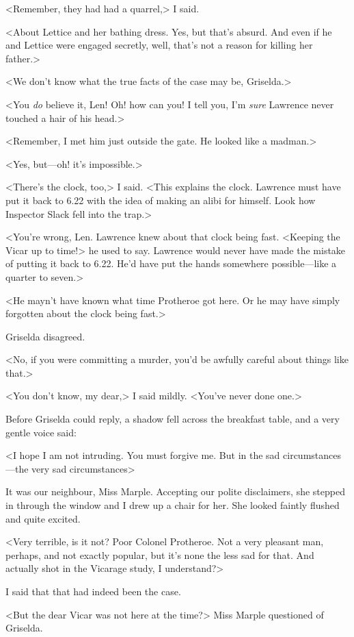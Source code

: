 <Remember, they had had a quarrel,> I said.

<About Lettice and her bathing dress. Yes, but that's absurd. And even if he and Lettice were engaged secretly, well, that's not a reason for killing her father.>

<We don't know what the true facts of the case may be, Griselda.>

<You \emph{do} believe it, Len! Oh! how can you! I tell you, I'm \emph{sure} Lawrence never touched a hair of his head.>

<Remember, I met him just outside the gate. He looked like a madman.>

<Yes, but—oh! it's impossible.>

<There's the clock, too,> I said. <This explains the clock. Lawrence must have put it back to 6.22 with the idea of making an alibi for himself. Look how Inspector Slack fell into the trap.>

<You're wrong, Len. Lawrence knew about that clock being fast. <Keeping the Vicar up to time!> he used to say. Lawrence would never have made the mistake of putting it back to 6.22. He'd have put the hands somewhere possible—like a quarter to seven.>

<He mayn't have known what time Protheroe got here. Or he may have simply forgotten about the clock being fast.>

Griselda disagreed.

<No, if you were committing a murder, you'd be awfully careful about things like that.>

<You don't know, my dear,> I said mildly. <You've never done one.>

Before Griselda could reply, a shadow fell across the breakfast table, and a very gentle voice said:

<I hope I am not intruding. You must forgive me. But in the sad circumstances—the very sad circumstances\longdash>

It was our neighbour, Miss Marple. Accepting our polite disclaimers, she stepped in through the window and I drew up a chair for her. She looked faintly flushed and quite excited.

<Very terrible, is it not? Poor Colonel Protheroe. Not a very pleasant man, perhaps, and not exactly popular, but it's none the less sad for that. And actually shot in the Vicarage study, I understand?>

I said that that had indeed been the case.

<But the dear Vicar was not here at the time?> Miss Marple questioned of Griselda.

